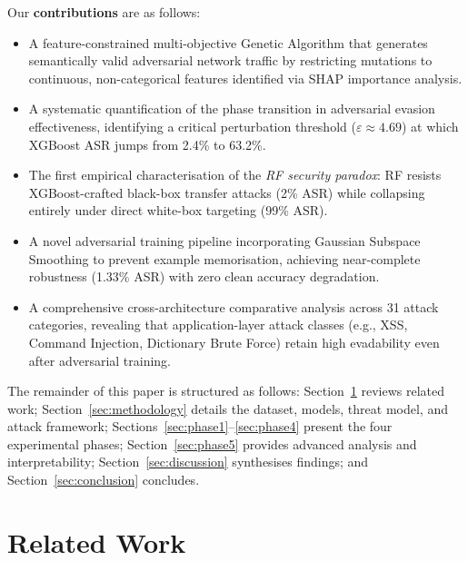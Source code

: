 \documentclass[review,12pt]{elsarticle}
\begin{document}
Our \textbf{contributions} are as follows:
\begin{itemize}
    \item A feature-constrained multi-objective Genetic Algorithm that generates semantically valid adversarial network traffic by restricting mutations to continuous, non-categorical features identified via SHAP importance analysis.
    \item A systematic quantification of the phase transition in adversarial evasion effectiveness, identifying a critical perturbation threshold (\(\varepsilon \approx 4.69\)) at which XGBoost ASR jumps from 2.4\% to 63.2\%.
    \item The first empirical characterisation of the \textit{RF security paradox}: RF resists XGBoost-crafted black-box transfer attacks (2\% ASR) while collapsing entirely under direct white-box targeting (99\% ASR).
    \item A novel adversarial training pipeline incorporating Gaussian Subspace Smoothing to prevent example memorisation, achieving near-complete robustness (1.33\% ASR) with zero clean accuracy degradation.
    \item A comprehensive cross-architecture comparative analysis across 31 attack categories, revealing that application-layer attack classes (e.g., XSS, Command Injection, Dictionary Brute Force) retain high evadability even after adversarial training.
\end{itemize}

The remainder of this paper is structured as follows: Section~\ref{sec:related} reviews related work; Section~\ref{sec:methodology} details the dataset, models, threat model, and attack framework; Sections~\ref{sec:phase1}--\ref{sec:phase4} present the four experimental phases; Section~\ref{sec:phase5} provides advanced analysis and interpretability; Section~\ref{sec:discussion} synthesises findings; and Section~\ref{sec:conclusion} concludes.

\section{Related Work}
\label{sec:related}
\end{document}
